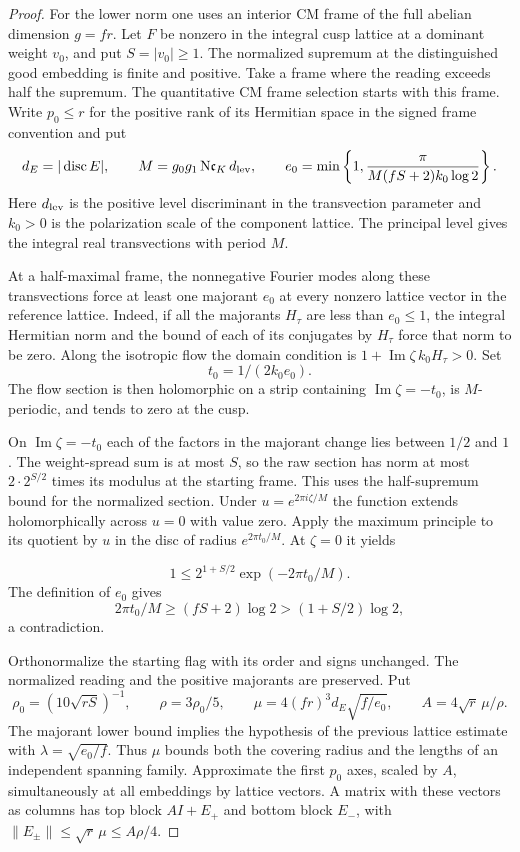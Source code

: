 \begin{proof}
For the lower norm one uses an interior CM frame of the full
abelian dimension \(g=fr\). Let \(F\) be nonzero in the integral
cusp lattice at a dominant weight \(v_0\), and put \(S=|v_0|\ge1\).
The normalized supremum at the distinguished good embedding
is finite and positive. Take a frame where the reading exceeds
half the supremum. The quantitative CM frame selection starts
with this frame. Write \(p_0\le r\) for the positive rank of
its Hermitian space in the signed frame convention and put
\[
 d_E=|\operatorname{disc}E|,\qquad
 M=g_0g_1\,\mathrm N\mathfrak c_K\,d_{\rm lev},\qquad
 e_0=\min\left\{1,\frac{\pi}{M(fS+2)k_0\log 2}\right\}.
\]
Here \(d_{\rm lev}\) is the positive level discriminant in the
transvection parameter and \(k_0>0\) is the polarization scale of
the component lattice. The principal level gives the integral
real transvections with period \(M\).

At a half-maximal frame,
the nonnegative Fourier modes along these transvections
force at least one majorant \(e_0\) at every nonzero lattice
vector in the reference lattice. Indeed, if all the majorants
\(H_\tau\) are less than \(e_0\le1\), the integral Hermitian
norm and the bound of each of its conjugates by \(H_\tau\)
force that norm to be zero. Along the isotropic flow the
domain condition is \(1+\operatorname{Im}\zeta\,k_0 H_\tau>0\).
Set 
\[
  t_0=1/(2k_0e_0).
\]
 The flow section is then holomorphic
on a strip containing \(\operatorname{Im}\zeta=-t_0\),
is \(M\)-periodic, and tends to zero at the cusp.

On
\(\operatorname{Im}\zeta=-t_0\) each of the factors in the
majorant change lies between \(1/2\) and \(1\). The
weight-spread sum is at most \(S\), so the raw section
has norm at most \(2\cdot 2^{S/2}\) times its modulus at
the starting frame. This uses the half-supremum bound
for the normalized section. Under \(u=e^{2\pi i\zeta/M}\)
the function extends holomorphically across \(u=0\)
with value zero. Apply the maximum principle to its
quotient by \(u\) in the disc of radius \(e^{2\pi t_0/M}\).
At \(\zeta=0\) it yields

\[
  1\le 2^{1+S/2}\exp(-2\pi t_0/M).
\]
The definition of \(e_0\) gives
\[
 2\pi t_0/M\ge(fS+2)\log 2>(1+S/2)\log 2,
\]
a contradiction.

Orthonormalize the starting flag with its order and signs
unchanged. The normalized reading and the positive majorants
are preserved. Put
\[
 \rho_0=(10\sqrt{rS})^{-1},\qquad \rho=3\rho_0/5,\qquad
 \mu=4(fr)^3d_E\sqrt{f/e_0},\qquad A=4\sqrt r\,\mu/\rho.
\]
The majorant lower bound implies the hypothesis of the previous
lattice estimate with \(\lambda=\sqrt{e_0/f}\). Thus \(\mu\)
bounds both the covering radius and the lengths of an independent
spanning family. Approximate the first \(p_0\) axes, scaled by \(A\),
simultaneously at all embeddings by lattice vectors. A matrix with
these vectors as columns has top block \(A I+E_+\) and bottom
block \(E_-\), with \(\|E_\pm\|\le\sqrt r\,\mu\le A\rho/4\).


\end{proof}
